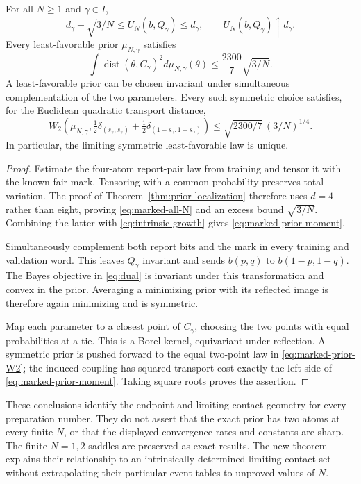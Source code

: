 \begin{corollary}
\label{cor:marked-prior-limit}
For all $N\ge1$ and $\gamma\in I$,
\begin{equation}\label{eq:marked-all-N}
 d_\gamma-\sqrt{3/N}\le U_N(b,Q_\gamma)\le d_\gamma,
 \qquad U_N(b,Q_\gamma)\uparrow d_\gamma.
\end{equation}
Every least-favorable prior $\mu_{N,\gamma}$ satisfies
\begin{equation}\label{eq:marked-prior-moment}
 \int\operatorname{dist}(\theta,C_\gamma)^2d\mu_{N,\gamma}(\theta)
       \le\frac{2300}{7}\sqrt{3/N}.
\end{equation}
A least-favorable prior can be chosen invariant under simultaneous
complementation of the two parameters. Every such symmetric choice
satisfies, for the Euclidean quadratic transport distance,
\begin{equation}\label{eq:marked-prior-W2}
 W_2\left(\mu_{N,\gamma},
      \tfrac12\delta_{(s_\gamma,s_\gamma)}+
      \tfrac12\delta_{(1-s_\gamma,1-s_\gamma)}\right)
 \le\sqrt{2300/7}\,(3/N)^{1/4}.
\end{equation}
In particular, the limiting symmetric least-favorable law is unique.
\end{corollary}
\begin{proof}
Estimate the four-atom report-pair law from training and tensor it with
the known fair mark. Tensoring with a common probability preserves total
variation. The proof of Theorem~\ref{thm:prior-localization} therefore
uses $d=4$ rather than eight, proving \eqref{eq:marked-all-N} and an
excess bound $\sqrt{3/N}$. Combining the latter with
\eqref{eq:intrinsic-growth} gives \eqref{eq:marked-prior-moment}.

Simultaneously complement both report bits and the mark in every
training and validation word. This leaves $Q_\gamma$ invariant and
sends $b(p,q)$ to $b(1-p,1-q)$. The Bayes objective in
\eqref{eq:dual} is invariant under this transformation and convex in
the prior. Averaging a minimizing prior with its reflected image is
therefore again minimizing and is symmetric.

Map each parameter to a closest point of $C_\gamma$, choosing the two
points with equal probabilities at a tie. This is a Borel kernel,
equivariant under reflection. A symmetric prior is pushed forward to
the equal two-point law in \eqref{eq:marked-prior-W2}; the induced
coupling has squared transport cost exactly the left side of
\eqref{eq:marked-prior-moment}. Taking square roots proves the assertion.
\end{proof}

These conclusions identify the endpoint and limiting contact geometry
for every preparation number. They do not assert that the exact prior
has two atoms at every finite $N$, or that the displayed convergence
rates and constants are sharp. The finite-$N=1,2$ saddles are preserved
as exact results. The new theorem explains their relationship to an
intrinsically determined limiting contact set without extrapolating
their particular event tables to unproved values of $N$.
